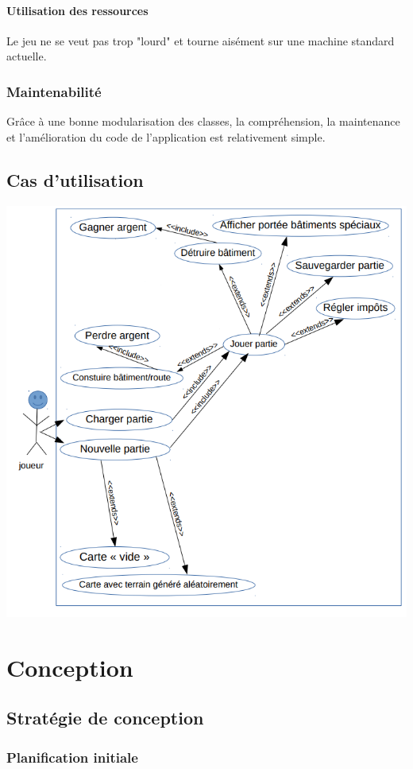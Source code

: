 \documentclass[a4paper,10pt,openany,oneside]{report}
\begin{document}
\subsubsection{Utilisation des ressources}
Le jeu ne se veut pas trop "lourd" et tourne aisément sur une machine standard actuelle.
\subsection{Maintenabilité}
Grâce à une bonne modularisation des classes, la compréhension, la maintenance et l'amélioration du code de l'application est relativement simple.
\section{Cas d'utilisation}
\includegraphics[width=\textwidth]{img/usecase.png}

\chapter{Conception}
\thispagestyle{headings}
\section{Stratégie de conception}
\subsection{Planification initiale}
\end{document}
